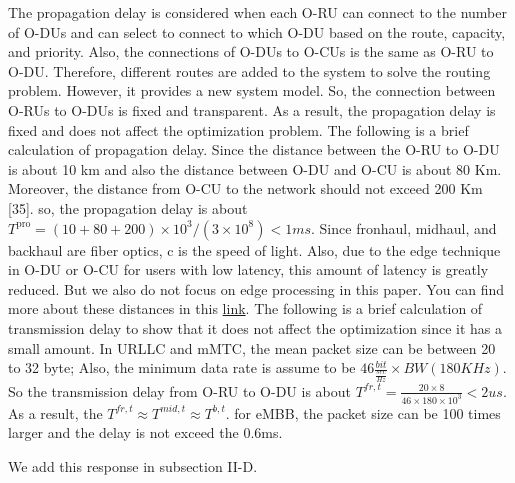 \documentclass[12pt, letterpaper]{article}
\begin{document}
The propagation delay is considered when each O-RU can connect to the number of O-DUs and can select to connect to which O-DU based on the route, capacity, and priority. Also, the connections of O-DUs to O-CUs is the same as O-RU to O-DU. Therefore, different routes are added to the system to solve the routing problem. However, it provides a new system model. So, the connection between O-RUs to O-DUs is fixed and transparent. As a result, the propagation delay is fixed and does not affect the optimization problem.
The following is a brief calculation of propagation delay.
Since the distance between the O-RU to O-DU is about 10 km and also the distance between O-DU and O-CU is about 80 Km. Moreover, the distance from O-CU to the network should not exceed 200 Km [35]. so, the propagation delay is about $T^{\text{pro}} = (10 + 80 + 200)\times 10^3 /(3\times 10^8) < 1ms $. Since fronhaul, midhaul, and backhaul are fiber optics, c is the speed of light. Also, due to the edge technique in O-DU or O-CU for users with low latency, this amount of latency is greatly reduced. But we also do not focus on edge processing in this paper. You can find more about these distances in this \href{https://blogs.keysight.com/blogs/inds.entry.html/2020/06/30/5g_testing_what_is-0nzj.html\%23:~:text=The\%20data\%20requirements\%20are\%20about,DUs\%20is\%20about\%2080\%20km.}{link}.
The following is a brief calculation of transmission delay to show that it does not affect the optimization since it has a small amount.
In URLLC and mMTC, the mean packet size can be between 20 to 32 byte; Also, the minimum data rate is assume to be $46 \frac{bit}{\frac{sec}{Hz}} \times BW (180 KHz)$. So the transmission delay from O-RU to O-DU is about $T^{fr,t} = \frac{20\times 8}{46 \times 180 \times 10^3} < 2 us$. As a result, the $T^{fr,t} \approx T^{mid,t} \approx T^{b,t}$. for eMBB, the packet size can be 100 times larger and the delay is not exceed the 0.6ms.  

We add this response in subsection II-D.
\end{document}
